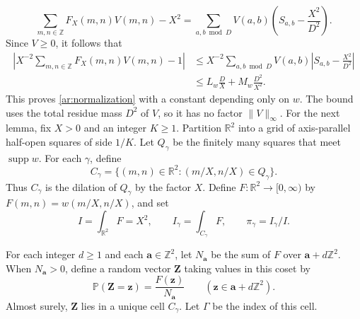 \documentclass[twoside]{aomart}
\makeatletter
\theoremstyle{paperplain}
\theoremstyle{paperdefinition}
\renewenvironment{proof}[1][\proofname]{\par\pushQED{\qed}%
  \normalfont\topsep6\p@\@plus3\p@\relax\trivlist
  \item[\hskip\labelsep\itshape #1\@addpunct{.}]\ignorespaces
}{\popQED\endtrivlist\@endpefalse}
\newcommand{\Z}{\mathbb Z}
\newcommand{\R}{\mathbb R}
\newcommand{\Pp}{\mathbb P}
\numberwithin{equation}{section}
\makeatother
\begin{document}
\begin{proof}
\begin{equation}
 \sum_{m,n\in\Z}F_X(m,n)V(m,n)-X^2
 =\sum_{a,b\bmod D}V(a,b)
       \left(S_{a,b}-\frac{X^2}{D^2}\right).
\end{equation}
Since $V\ge0$, it follows that
\begin{equation}
 \begin{aligned}
 \left|X^{-2}\sum_{m,n\in\Z}F_X(m,n)V(m,n)-1\right|
 &\le X^{-2}\sum_{a,b\bmod D}V(a,b)
       \left|S_{a,b}-\frac{X^2}{D^2}\right|\\
 &\le L_w\frac DX+M_w\frac{D^2}{X^2}.
 \end{aligned}
\end{equation}
This proves \eqref{ar:normalization} with a constant depending
only on $w$. The bound uses the total residue
mass $D^2$ of $V$, so it has no factor $\|V\|_\infty$.
\end{proof}
For the next lemma, fix $X>0$ and an integer $K\ge1$.
Partition $\R^2$ into a grid of axis-parallel half-open squares
of side $1/K$. Let $Q_\gamma$ be the finitely many squares
that meet $\operatorname{supp}w$. For each $\gamma$, define
\begin{equation*}
 C_\gamma=\{(m,n)\in\R^2:(m/X,n/X)\in Q_\gamma\}.
\end{equation*}
Thus $C_\gamma$ is the dilation of $Q_\gamma$ by the factor $X$.
Define $F:\R^2\to[0,\infty)$ by $F(m,n)=w(m/X,n/X)$, and set
\begin{equation*}
 I=\int_{\R^2}F=X^2,\qquad
 I_\gamma=\int_{C_\gamma}F,\qquad \pi_\gamma=I_\gamma/I.
\end{equation*}

For each integer $d\ge1$ and each $\mathbf a\in\Z^2$,
let $N_{\mathbf a}$ be the sum of $F$ over $\mathbf a+d\Z^2$.
When $N_{\mathbf a}>0$, define a random vector $\mathbf Z$
taking values in this coset by
\begin{equation*}
 \Pp(\mathbf Z=\mathbf z)=\frac{F(\mathbf z)}{N_{\mathbf a}}
 \qquad(\mathbf z\in\mathbf a+d\Z^2).
\end{equation*}
Almost surely, $\mathbf Z$ lies in a unique cell $C_\gamma$.
Let $\Gamma$ be the index of this cell.
\end{document}
